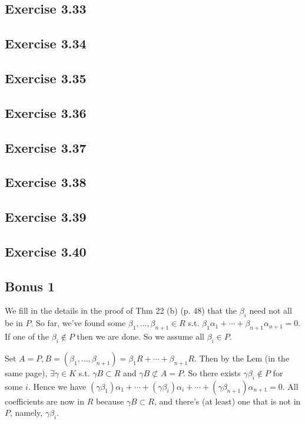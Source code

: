 \documentclass[../Chapter.tex]{subfiles}
\begin{document}
\subsection*{Exercise 3.33}

\subsection*{Exercise 3.34}

\subsection*{Exercise 3.35}

\subsection*{Exercise 3.36}

\subsection*{Exercise 3.37}

\subsection*{Exercise 3.38}

\subsection*{Exercise 3.39}

\subsection*{Exercise 3.40}

\subsection*{Bonus 1}

We fill in the details in the proof of Thm 22 (b) (p. 48) that the $\beta_i$ need not all be in $P$. So far, we've found some $\beta_1,\ldots,\beta_{n+1}\in R$ s.t. $\beta_1\alpha_1+\cdots+\beta_{n+1}\alpha_{n+1}=0$. If one of the $\beta_i\notin P$ then we are done. So we assume all $\beta_i\in P$. 

Set $A=P,B=(\beta_1,\ldots,\beta_{n+1})=\beta_1R+\cdots+\beta_{n+1}R$. Then by the Lem (in the same page), $\exists \gamma\in K$ s.t. $\gamma B\subset R$ and $\gamma B\not\subset A=P$. So there exists $\gamma\beta_i\notin P$ for some $i$. Hence we have $(\gamma\beta_1)\alpha_1+\cdots+(\gamma\beta_i)\alpha_i+\cdots+(\gamma\beta_{n+1})\alpha_{n+1}=0$. All coefficients are now in $R$ because $\gamma B\subset R$, and there's (at least) one that is not in $P$, namely, $\gamma\beta_i$.
\end{document}
